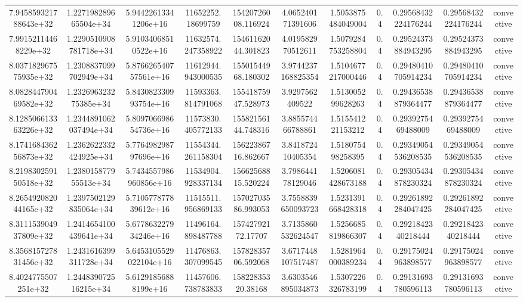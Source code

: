 \begin{table}
\begin{tabular}{ccccccccccc}
7.945859321788643e+32 & 1.227198289665504e+34 & 5.94422613341206e+16 & 11652252.18699759 & 15420726008.116924 & 4.065240171391606 & 1.5053875484049004 & 0.4 & 0.29568432224176244 & 0.29568432224176244 & convective \\
7.99152114468229e+32 & 1.2290510908781718e+34 & 5.91034068510522e+16 & 11632574.247358922 & 15461162044.301823 & 4.019582970512611 & 1.5079284753258804 & 0.4 & 0.29524373884943295 & 0.29524373884943295 & convective \\
8.037182967575935e+32 & 1.2308837099702949e+34 & 5.876626540757561e+16 & 11612944.943000535 & 15501544968.180302 & 3.9744237168825354 & 1.5104677217000446 & 0.4 & 0.29480410705914234 & 0.29480410705914234 & convective \\
8.082844790469582e+32 & 1.232696323275385e+34 & 5.843082330993754e+16 & 11593363.814791068 & 15541875947.528973 & 3.9297562409522 & 1.513005299628263 & 0.4 & 0.29436538879364477 & 0.29436538879364477 & convective \\
8.128506613363226e+32 & 1.2344891062037494e+34 & 5.809706698654736e+16 & 11573830.405772133 & 15582156144.748316 & 3.885574466788861 & 1.515541221153212 & 0.4 & 0.2939275469488009 & 0.2939275469488009 & convective \\
8.174168436256873e+32 & 1.2362622332424925e+34 & 5.776498298797696e+16 & 11554344.261158304 & 15622386716.862667 & 3.841872410405354 & 1.518075498258395 & 0.4 & 0.29349054536208535 & 0.29349054536208535 & convective \\
8.219830259150518e+32 & 1.238015877955513e+34 & 5.7434557986960856e+16 & 11534904.928337134 & 15662568815.520224 & 3.798644178129046 & 1.5206081428673188 & 0.4 & 0.29305434878230324 & 0.29305434878230324 & convective \\
8.265492082044165e+32 & 1.2397502129835064e+34 & 5.710577877839612e+16 & 11515511.956869133 & 15702703586.993053 & 3.7558839650093723 & 1.5231391668428318 & 0.4 & 0.29261892284047425 & 0.29261892284047425 & convective \\
8.311153904937809e+32 & 1.2414654100439641e+34 & 5.677863227934246e+16 & 11496164.898487788 & 15742792172.17707 & 3.7135860532624547 & 1.5256685819866307 & 0.4 & 0.2921842340218444 & 0.2921842340218444 & convective \\
8.356815727831456e+32 & 1.2431616399311728e+34 & 5.6453105529022104e+16 & 11476863.307099545 & 15782835706.592068 & 3.6717448107517487 & 1.5281964000389234 & 0.4 & 0.29175024963898577 & 0.29175024963898577 & convective \\
8.4024775507251e+32 & 1.244839072516215e+34 & 5.61291856888199e+16 & 11457606.738783833 & 15822835320.38168 & 3.6303546895034873 & 1.5307226326783199 & 0.4 & 0.29131693780596113 & 0.29131693780596113 & convective \\

\end{tabular}
\end{table}
